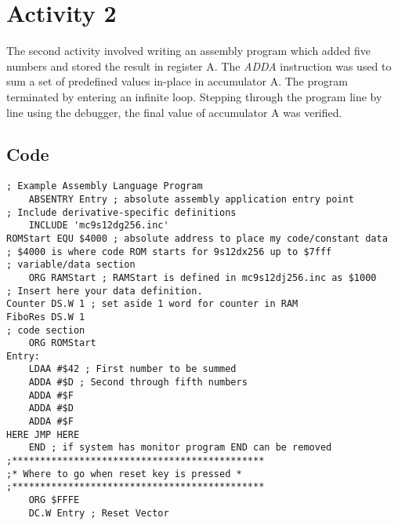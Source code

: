 \section{Activity 2}

The second activity involved writing an assembly program which added five numbers and stored the result in register A.
The \emph{ADDA} instruction was used to sum a set of predefined values in-place in accumulator A.
The program terminated by entering an infinite loop.
Stepping through the program line by line using the debugger, the final value of accumulator A was verified.

\subsection{Code}

{\footnotesize
\begin{lstlisting}
; Example Assembly Language Program
	ABSENTRY Entry ; absolute assembly application entry point
; Include derivative-specific definitions
	INCLUDE 'mc9s12dg256.inc'
ROMStart EQU $4000 ; absolute address to place my code/constant data
; $4000 is where code ROM starts for 9s12dx256 up to $7fff
; variable/data section
	ORG RAMStart ; RAMStart is defined in mc9s12dj256.inc as $1000
; Insert here your data definition.
Counter DS.W 1 ; set aside 1 word for counter in RAM
FiboRes DS.W 1
; code section
	ORG ROMStart
Entry:
	LDAA #$42 ; First number to be summed
	ADDA #$D ; Second through fifth numbers
	ADDA #$F
	ADDA #$D
	ADDA #$F 
HERE JMP HERE
	END ; if system has monitor program END can be removed
;*********************************************
;* Where to go when reset key is pressed *
;*********************************************
	ORG $FFFE
	DC.W Entry ; Reset Vector
\end{lstlisting}
}